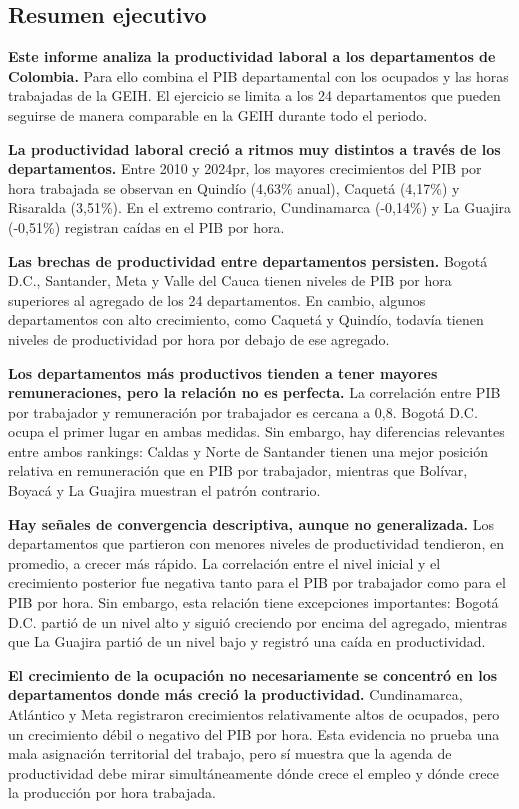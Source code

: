 \documentclass[12pt, a4paper]{article}
\begin{document}
\begin{mdframed}[
  linewidth=1pt,
  linecolor=gray!60,
  backgroundcolor=gray!6,
  innertopmargin=12pt,
  innerbottommargin=12pt,
  innerleftmargin=14pt,
  innerrightmargin=14pt
]
\section*{Resumen ejecutivo}
\textbf{Este informe analiza la productividad laboral a los departamentos de Colombia.} Para ello combina el PIB departamental con los ocupados y las horas trabajadas de la GEIH. El ejercicio se limita a los 24 departamentos que pueden seguirse de manera comparable en la GEIH durante todo el periodo.

\textbf{La productividad laboral creció a ritmos muy distintos a través de los departamentos.} Entre 2010 y 2024pr, los mayores crecimientos del PIB por hora trabajada se observan en Quindío (4,63\% anual), Caquetá (4,17\%) y Risaralda (3,51\%). En el extremo contrario, Cundinamarca (-0,14\%) y La Guajira (-0,51\%) registran caídas en el PIB por hora.

\textbf{Las brechas de productividad entre departamentos persisten.} Bogotá D.C., Santander, Meta y Valle del Cauca tienen niveles de PIB por hora superiores al agregado de los 24 departamentos. En cambio, algunos departamentos con alto crecimiento, como Caquetá y Quindío, todavía tienen niveles de productividad por hora por debajo de ese agregado.

\textbf{Los departamentos más productivos tienden a tener mayores remuneraciones, pero la relación no es perfecta.} La correlación entre PIB por trabajador y remuneración por trabajador es cercana a 0,8. Bogotá D.C. ocupa el primer lugar en ambas medidas. Sin embargo, hay diferencias relevantes entre ambos rankings: Caldas y Norte de Santander tienen una mejor posición relativa en remuneración que en PIB por trabajador, mientras que Bolívar, Boyacá y La Guajira muestran el patrón contrario.

\textbf{Hay señales de convergencia descriptiva, aunque no generalizada.} Los departamentos que partieron con menores niveles de productividad tendieron, en promedio, a crecer más rápido. La correlación entre el nivel inicial y el crecimiento posterior fue negativa tanto para el PIB por trabajador como para el PIB por hora. Sin embargo, esta relación tiene excepciones importantes: Bogotá D.C. partió de un nivel alto y siguió creciendo por encima del agregado, mientras que La Guajira partió de un nivel bajo y registró una caída en productividad.

\textbf{El crecimiento de la ocupación no necesariamente se concentró en los departamentos donde más creció la productividad.} Cundinamarca, Atlántico y Meta registraron crecimientos relativamente altos de ocupados, pero un crecimiento débil o negativo del PIB por hora. Esta evidencia no prueba una mala asignación territorial del trabajo, pero sí muestra que la agenda de productividad debe mirar simultáneamente dónde crece el empleo y dónde crece la producción por hora trabajada.
\end{mdframed}
\end{document}
